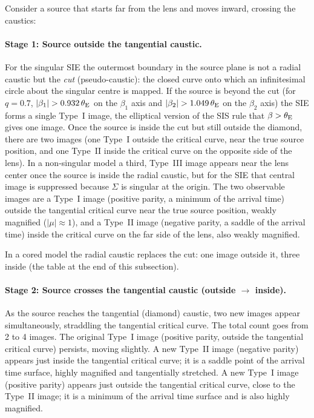Consider a source that starts far from the lens and moves inward,
crossing the caustics:

\paragraph{Stage 1: Source outside the tangential caustic.}
For the singular SIE the outermost boundary in the source plane is
not a radial caustic but the \emph{cut} (pseudo-caustic): the closed
curve onto which an infinitesimal circle about the singular centre
is mapped.  If the source is beyond the cut (for $q = 0.7$,
$|\beta_1| > 0.932\,\theta_{\mathrm{E}}$ on the $\beta_1$ axis and
$|\beta_2| > 1.049\,\theta_{\mathrm{E}}$ on the $\beta_2$ axis) the SIE forms a
single Type~I image, the elliptical version of the SIS rule
that $\beta > \theta_{\mathrm{E}}$ gives one image.  Once the source is inside
the cut but still outside the diamond, there are two images
(one Type~I outside the critical curve, near the true source
position, and one Type~II inside the critical curve on the opposite
side of the lens).  In a non-singular model a third, Type~III image
appears near the lens center once the source is inside the radial
caustic, but for the SIE that central image is suppressed because
$\Sigma$ is singular at the origin.  The two observable images are a
Type~I image (positive parity, a minimum of the arrival time) outside
the tangential critical curve near the true source position, weakly
magnified ($|\mu| \approx 1$), and a Type~II image (negative parity,
a saddle of the arrival time) inside the critical curve on the far
side of the lens, also weakly magnified.

\begin{annotation}
In a cored model the radial caustic replaces the cut: one image outside it,
three inside (the table at the end of this subsection).
\end{annotation}


\paragraph{Stage 2: Source crosses the tangential caustic (outside
$\to$ inside).}
As the source reaches the tangential (diamond) caustic, two new
images appear simultaneously, straddling the tangential critical
curve.  The total count goes from 2 to 4 images.  The original
Type~I image (positive parity, outside the tangential critical curve)
persists, moving slightly.  A new Type~II image (negative parity)
appears just inside the tangential critical curve; it is a saddle
point of the arrival time surface, highly magnified and tangentially
stretched.  A new Type~I image (positive parity) appears just outside
the tangential critical curve, close to the Type~II image; it is a
minimum of the arrival time surface and is also highly magnified.

